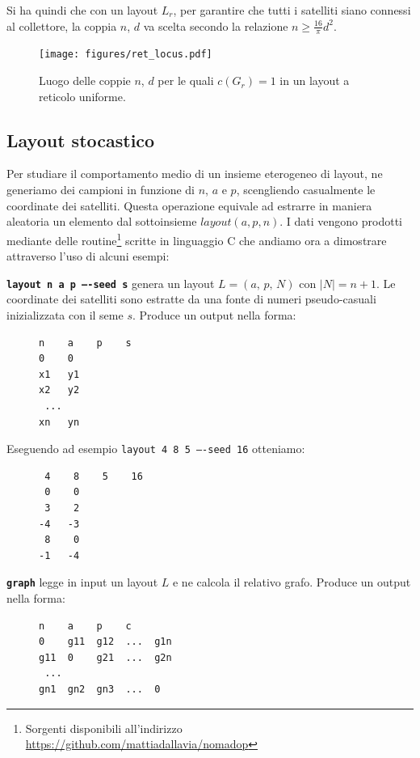 \documentclass[a4paper,11pt]{article}
\theoremstyle{definition}
\begin{document}
Si ha quindi che con un layout $L_r$, per garantire che tutti i satelliti siano connessi al collettore, la coppia $n$, $d$ va scelta secondo la relazione $n \geq \frac{16}{\pi} d^2$.

\begin{figure}[H]
\centering
\texttt{[image: figures/ret\_locus.pdf]}
\caption{Luogo delle coppie $n$, $d$ per le quali $c(G_r) = 1$ in un layout a reticolo uniforme.}
\end{figure}

\subsection{Layout stocastico}

Per studiare il comportamento medio di un insieme eterogeneo di layout, ne generiamo dei campioni in funzione di $n$, $a$ e $p$, scengliendo casualmente le coordinate dei satelliti. Questa operazione equivale ad estrarre in maniera aleatoria un elemento dal sottoinsieme $layout(a, p, n)$. I dati vengono prodotti mediante delle routine\footnote{Sorgenti disponibili all'indirizzo \url{https://github.com/mattiadallavia/nomadop}} scritte in linguaggio C che andiamo ora a dimostrare attraverso l'uso di alcuni esempi:

\texttt{\textbf{layout n a p ----seed s}} genera un layout $L = (a,\,p,\,N)$ con $|N| = n+1$. Le coordinate dei satelliti sono estratte da una fonte di numeri pseudo-casuali inizializzata con il seme $s$. Produce un output nella forma:

\begin{figure}[H]
\centering
\begin{BVerbatim}
n    a    p    s
0    0
x1   y1
x2   y2
 ...
xn   yn
\end{BVerbatim}
\end{figure}

Eseguendo ad esempio \texttt{layout 4 8 5 ----seed 16} otteniamo:

\begin{figure}[H]
\centering
\begin{BVerbatim}
 4    8    5    16
 0    0
 3    2
-4   -3
 8    0
-1   -4
\end{BVerbatim}
\end{figure}

\texttt{\textbf{graph}} legge in input un layout $L$ e ne calcola il relativo grafo. Produce un output nella forma:

\begin{figure}[H]
\centering
\begin{BVerbatim}
n    a    p    c
0    g11  g12  ...  g1n
g11  0    g21  ...  g2n
 ...
gn1  gn2  gn3  ...  0
\end{BVerbatim}
\end{figure}
\end{document}
